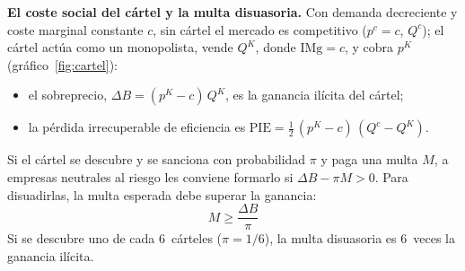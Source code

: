 \documentclass[11pt]{article}
\begin{document}
\begin{anotaciones}
\textbf{El coste social del cártel y la multa disuasoria.} Con demanda decreciente y coste marginal constante $c$, sin cártel el mercado es competitivo ($p^c=c$, $Q^c$); el cártel actúa como un monopolista, vende $Q^K$, donde $\mathrm{IMg}=c$, y cobra $p^K$ (gráfico~\ref{fig:cartel}):
\begin{itemize}
\item el sobreprecio, $\Delta B=(p^K-c)\,Q^K$, es la ganancia ilícita del cártel;
\item la pérdida irrecuperable de eficiencia es $\mathrm{PIE}=\tfrac12\,(p^K-c)\,(Q^c-Q^K)$.
\end{itemize}
Si el cártel se descubre y se sanciona con probabilidad $\pi$ y paga una multa $M$, a empresas neutrales al riesgo les conviene formarlo si $\Delta B-\pi M>0$. Para disuadirlas, la multa esperada debe superar la ganancia:
\begin{equation}\label{eq:multa-disuasoria}
M\geq\frac{\Delta B}{\pi}
\end{equation}
Si se descubre uno de cada 6~cárteles ($\pi=1/6$), la multa disuasoria es 6~veces la ganancia ilícita.
\begin{figuracaja}
\centering
\caption{El coste social de un cártel: sobreprecio y pérdida de eficiencia}\label{fig:cartel}
\end{figuracaja}
\end{anotaciones}
\end{document}
